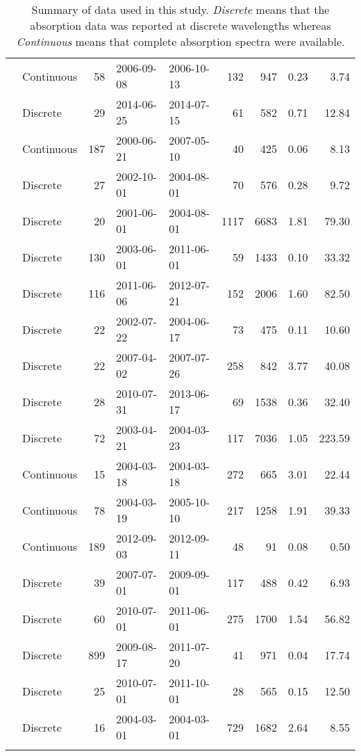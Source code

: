 \begin{longtable}{llrllrrrr}
  \citet{Norman2011} & Continuous &  58 & 2006-09-08 & 2006-10-13 & 132 & 947 & 0.23 & 3.74 \\ 
  \citet{Oestreich2016} & Discrete &  29 & 2014-06-25 & 2014-07-15 & 61 & 582 & 0.71 & 12.84 \\ 
  \citet{Osburn2007} & Continuous & 187 & 2000-06-21 & 2007-05-10 & 40 & 425 & 0.06 & 8.13 \\ 
  \citet{Osburn2009} & Discrete &  27 & 2002-10-01 & 2004-08-01 & 70 & 576 & 0.28 & 9.72 \\ 
  \citet{Osburn2011a} & Discrete &  20 & 2001-06-01 & 2004-08-01 & 1117 & 6683 & 1.81 & 79.30 \\ 
  \citet{Osburn2016} & Discrete & 130 & 2003-06-01 & 2011-06-01 & 59 & 1433 & 0.10 & 33.32 \\ 
  \citet{Polaris2012} & Discrete & 116 & 2011-06-06 & 2012-07-21 & 152 & 2006 & 1.60 & 82.50 \\ 
  \citet{Retamal2007} & Discrete &  22 & 2002-07-22 & 2004-06-17 & 73 & 475 & 0.11 & 10.60 \\ 
  \citet{shank2009} & Discrete &  22 & 2007-04-02 & 2007-07-26 & 258 & 842 & 3.77 & 40.08 \\ 
  \citet{Shen2014} & Discrete &  28 & 2010-07-31 & 2013-06-17 & 69 & 1538 & 0.36 & 32.40 \\ 
  \citet{Sickman2010} & Discrete &  72 & 2003-04-21 & 2004-03-23 & 117 & 7036 & 1.05 & 223.59 \\ 
  \citet{Stedmon2007a} & Continuous &  15 & 2004-03-18 & 2004-03-18 & 272 & 665 & 3.01 & 22.44 \\ 
  \citet{Stedmon2011} & Continuous &  78 & 2004-03-19 & 2005-10-10 & 217 & 1258 & 1.91 & 39.33 \\ 
  \citet{Stedmon2015} & Continuous & 189 & 2012-09-03 & 2012-09-11 & 48 & 91 & 0.08 & 0.50 \\ 
  \citet{Tehrani2013} & Discrete &  39 & 2007-07-01 & 2009-09-01 & 117 & 488 & 0.42 & 6.93 \\ 
  \citet{Wagner2015} & Discrete &  60 & 2010-07-01 & 2011-06-01 & 275 & 1700 & 1.54 & 56.82 \\ 
  \citet{Werdell2003} & Discrete & 899 & 2009-08-17 & 2011-07-20 & 41 & 971 & 0.04 & 17.74 \\ 
  \citet{Yang2013a} & Discrete &  25 & 2010-07-01 & 2011-10-01 & 28 & 565 & 0.15 & 12.50 \\ 
  \citet{Zhang2005} & Discrete &  16 & 2004-03-01 & 2004-03-01 & 729 & 1682 & 2.64 & 8.55 \\ 
   \hline
\hline
\caption{Summary of data used in this study. \textit{Discrete} means that the 
absorption data was reported at discrete wavelengths whereas 
\textit{Continuous} means that complete absorption spectra were available.} 
\end{longtable}
\endgroup

